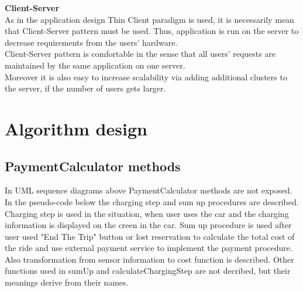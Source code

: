 \documentclass[12pt, letterpaper]{article}
\begin{document}
\vspace{0.5cm}
\textbf{Client-Server} \\
\vspace{0.5cm}
As in the application design Thin Client paradigm is used, it is necessarily mean that Client-Server pattern must be used. Thus, application is run on the server to decrease requirements from the users' hardware. \\
Client-Server pattern is comfortable in the sense that all users' requests are maintained by the same application on one server. \\
Moreover it is also easy to increase scalability via adding additional clusters to the server, if the number of users gets larger. \\
\newpage


\section{Algorithm design}
\label{sub:alg_des}
\subsection{PaymentCalculator methods}
In UML sequence diagrams above PaymentCalculator methods are not exposed. \\
In the pseudo-code below the charging step and sum up procedures are described. Charging step is used in the situation, when user uses the car and the charging information is displayed on the creen in the car. Sum up procedure is used after user used "End The Trip" button or lost reservation to calculate the total cost of the ride and use external payment service to implement the payment procedure. \\
Also transformation from sensor information to cost function is described. Other functions used in sumUp and calculateChargingStep are not decribed, but their meanings derive from their names.
\end{document}
